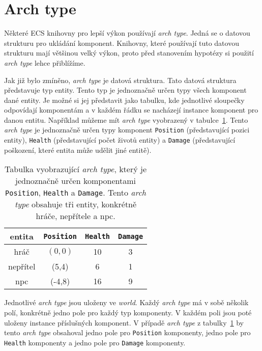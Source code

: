 \section{Arch type}
Některé ECS knihovny pro lepší výkon používají \textit{arch type}. Jedná se o datovou strukturu pro ukládání komponent. Knihovny, které používají tuto datovou strukturu mají většinou velký výkon, proto před stanovením hypotézy si použití \textit{arch type} lehce přiblížíme.

Jak již bylo zmíněno, \textit{arch type} je datová struktura. Tato datová struktura představuje typ entity. Tento typ je jednoznačně určen typy všech komponent dané entity. Je možné si jej představit jako tabulku, kde jednotlivé sloupečky odpovídají komponentám a v každém řádku se nacházejí instance komponent pro danou entitu. Například můžeme mít \textit{arch type} vyobrazený v tabulce~\ref{tab:arch-type}. Tento \textit{arch type} je jednoznačně určen typy komponent \texttt{Position} (představující pozici entity), \texttt{Health} (představující počet životů entity) a \texttt{Damage} (představující poškození, které entita může udělit jiné entitě).

\begin{table}
    \centering\footnotesize\sf
    \begin{tabular}{c c c c}
        \toprule
        entita & \texttt{Position} & \texttt{Health} & \texttt{Damage} \\
        \midrule
        hráč & $(0,0)$ & 10 & 3 \\
        nepřítel & (5,4) & 6 & 1 \\
        npc & (-4,8) & 16 & 9\\
        \bottomrule
    \end{tabular}
    \caption{Tabulka vyobrazující \textit{arch type}, který je jednoznačně určen komponentami \texttt{Position}, \texttt{Health} a \texttt{Damage}. Tento \textit{arch type} obsahuje tři entity, konkrétně hráče, nepřítele a npc.}
    \label{tab:arch-type}
\end{table}

Jednotlivé \textit{arch type} jsou uloženy ve \textit{world}. Každý \textit{arch type} má v sobě několik polí, konkrétně jedno pole pro každý typ komponenty. V každém poli jsou poté uloženy instance příslušných komponent. V případě \textit{arch type} z tabulky~\ref{tab:arch-type} by tento \textit{arch type} obsahoval jedno pole pro \texttt{Position} komponenty, jedno pole pro \texttt{Health} komponenty a jedno pole pro \texttt{Damage} komponenty.


